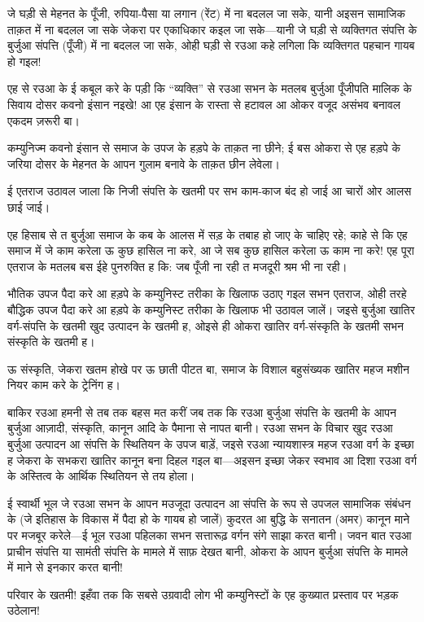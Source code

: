 \documentclass[12pt,a4paper,oneside]{book}
\begin{document}
जे घड़ी से मेहनत के पूँजी, रुपिया-पैसा या लगान (रेंट) में ना बदलल जा सके, यानी अइसन सामाजिक ताक़त में ना बदलल जा सके जेकरा पर एकाधिकार कइल जा सके—यानी जे घड़ी से व्यक्तिगत संपत्ति के बुर्जुआ संपत्ति (पूँजी) में ना बदलल जा सके, ओही घड़ी से रउआ कहे लगिला कि व्यक्तिगत पहचान गायब हो गइल!

एह से रउआ के ई कबूल करे के पड़ी कि “व्यक्ति” से रउआ सभन के मतलब बुर्जुआ पूँजीपति मालिक के सिवाय दोसर कवनो इंसान नइखे! आ एह इंसान के रास्ता से हटावल आ ओकर वजूद असंभव बनावल एकदम ज़रूरी बा।

कम्युनिज्म कवनो इंसान से समाज के उपज के हड़पे के ताक़त ना छीने; ई बस ओकरा से एह हड़पे के जरिया दोसर के मेहनत के आपन गुलाम बनावे के ताक़त छीन लेवेला।

ई एतराज उठावल जाला कि निजी संपत्ति के खतमी पर सभ काम-काज बंद हो जाई आ चारों ओर आलस छाई जाई।

एह हिसाब से त बुर्जुआ समाज के कब के आलस में सड़ के तबाह हो जाए के चाहिए रहे; काहे से कि एह समाज में जे काम करेला ऊ कुछ हासिल ना करे, आ जे सब कुछ हासिल करेला ऊ काम ना करे! एह पूरा एतराज के मतलब बस ईहे पुनरुक्ति ह कि: जब पूँजी ना रही त मजदूरी श्रम भी ना रही।

भौतिक उपज पैदा करे आ हड़पे के कम्युनिस्ट तरीका के खिलाफ उठाए गइल सभन एतराज, ओही तरहे बौद्धिक उपज पैदा करे आ हड़पे के कम्युनिस्ट तरीका के खिलाफ भी उठावल जालें। जइसे बुर्जुआ खातिर वर्ग-संपत्ति के खतमी खुद उत्पादन के खतमी ह, ओइसे ही ओकरा खातिर वर्ग-संस्कृति के खतमी सभन संस्कृति के खतमी ह।

ऊ संस्कृति, जेकरा खतम होखे पर ऊ छाती पीटत बा, समाज के विशाल बहुसंख्यक खातिर महज मशीन नियर काम करे के ट्रेनिंग ह।

बाकिर रउआ हमनी से तब तक बहस मत करीं जब तक कि रउआ बुर्जुआ संपत्ति के खतमी के आपन बुर्जुआ आज़ादी, संस्कृति, कानून आदि के पैमाना से नापत बानी। रउआ सभन के विचार खुद रउआ बुर्जुआ उत्पादन आ संपत्ति के स्थितियन के उपज बाड़ें, जइसे रउआ न्यायशास्त्र महज रउआ वर्ग के इच्छा ह जेकरा के सभकरा खातिर कानून बना दिहल गइल बा—अइसन इच्छा जेकर स्वभाव आ दिशा रउआ वर्ग के अस्तित्व के आर्थिक स्थितियन से तय होला।

ई स्वार्थी भूल जे रउआ सभन के आपन मउजूदा उत्पादन आ संपत्ति के रूप से उपजल सामाजिक संबंधन के (जे इतिहास के विकास में पैदा हो के गायब हो जालें) कुदरत आ बुद्धि के सनातन (अमर) कानून माने पर मजबूर करेले—ई भूल रउआ पहिलका सभन सत्तारूढ़ वर्गन संगे साझा करत बानी। जवन बात रउआ प्राचीन संपत्ति या सामंती संपत्ति के मामले में साफ़ देखत बानी, ओकरा के आपन बुर्जुआ संपत्ति के मामले में माने से इनकार करत बानी!

परिवार के खतमी! इहँवा तक कि सबसे उग्रवादी लोग भी कम्युनिस्टों के एह कुख्यात प्रस्ताव पर भड़क उठेलान!
\end{document}
